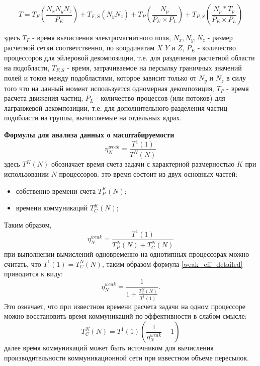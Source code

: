 \begin{equation}
\label{PIC-timestep}
T=T_{F} \left ( \frac{N_x N_y N_z }{P_E}\right )+ T_{F,S}\left (N_y N_z\right ) + T_P\left(\frac{N_p}{P_E\times P_L}\right) +T_{P,S}\left (\frac{N_p*T_p}{P_E\times P_L}\right)
\end{equation}

здесь $T_{F}$ - время вычисления электромагнитного поля, $N_x, N_y, N_z$ - размер расчетной сетки соответственно, по координатам $X$ $Y$ и $Z$, $P_E$ - количество процессоров для эйлеровой декомпозиции, т.е. для разделения расчетной области на подобласти, $T_{F,S}$ - время, затрачиваемое на персылку граничных значений полей и токов между подобластями, которое зависит только от $N_y$ и $N_z$ в силу того что на данный момент используется одномерная декомпозиция,  $T_P$ - время расчета движения частиц, $P_L$ - количество процессов (или потоков) для лагранжевой декомпозиции, т.е. для дополнительного разделения частиц подобласти на группы, вычисляемые на отдельных ядрах.

\textbf{Формулы для анализа данных о масштабируемости}
\begin{equation}
\label{weak_eff}
\eta^{weak}_N = \frac{T^1(1)}{T^N(N)}
\end{equation}
здесь $T^K(N)$ обозначает время счета задачи с характерной размерностью $K$ при использовании $N$ процессоров.
это время состоит из двух основных частей:
\begin{itemize}
	\item собственно времени счета $T^K_{P}(N)$;
	\item времени коммуникаций $T^K_C(N)$;
\end{itemize}
Таким образом,
\begin{equation}
\label{weak_eff_detailed}
\eta^{weak}_N = \frac{T^1(1)}{T^N_{P}(N)+T^N_C(N)}
\end{equation}
при выполнении вычислений одновременно на однотипных процессорах
можно считать, что $T^1(1) = T^N_C(N)$, таким образом формула
\ref{weak_eff_detailed} приводится к виду:
\begin{equation}
\label{weak_eff_detailed-time}
\eta^{weak}_N = \frac{1}{1+ \frac{T^N_{C}(N)}{T^1(1)}}.
\end{equation}
Это означает, что при известном времени расчета задачи на одном процессоре можно восстановить время коммуникаций по эффективности в слабом смысле:
\begin{equation}
\label{comm_time_from_efficiency}
T^N_{C}(N) = T^1(1) \left(\frac{1}{\eta^{weak}_N} - 1\right)
\end{equation}
далее время коммуникаций может быть источником для вычисления производительности коммуникационной сети при известном объеме пересылок.


